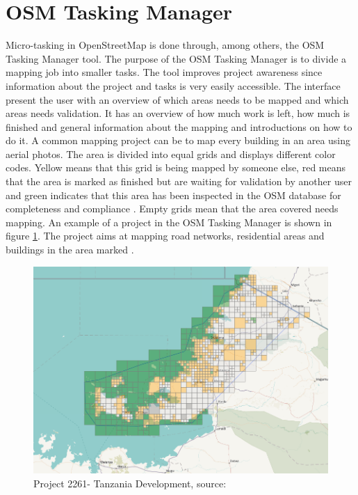 \section{OSM Tasking Manager}
Micro-tasking in OpenStreetMap is done through, among others, the OSM Tasking Manager tool. The purpose of the OSM Tasking Manager is to divide a mapping job into smaller tasks. The tool improves project awareness since information about the project and tasks is very easily accessible. The interface present the user with an overview of which areas needs to be mapped and which areas needs validation. It has an overview of how much work is left, how much is finished and general information about the mapping and introductions on how to do it. A common mapping project can be to map every building in an area using aerial photos. The area is divided into equal grids and displays different color codes. Yellow means that this grid is being mapped by someone else, red means that the area is marked as finished but are waiting for validation by another user and green indicates that this area has been inspected in the OSM database for completeness and compliance \cite{Palen2015}. Empty grids mean that the area covered needs mapping. An example of a project in the OSM Tasking Manager is shown in figure \ref{fig:project2261}. The project aims at mapping road networks, residential areas and buildings in the area marked \cite{HOTTaskingManager2016}.  

\begin{figure}[H]
    \centering
    \includegraphics[scale=0.3]{figures/FixedByMe/taskingmanager.png}
    \caption{Project 2261- Tanzania Development, source: \cite{HOTTaskingManager2016a}}
    \label{fig:project2261}
\end{figure} 

